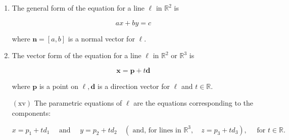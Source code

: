 \documentclass[10pt]{article}
\begin{document}
\begin{enumerate}
\item  The general form of the equation for a line $\ell$ in $\mathbb{R}^{2}$ is

$$
a x+b y=c
$$

where $\mathbf{n}=[a, b]$ is a normal vector for $\ell$.

\item  The vector form of the equation for a line $\ell$ in $\mathbb{R}^{2}$ or $\mathbb{R}^{3}$ is

$$
\mathbf{x}=\mathbf{p}+t \mathbf{d}
$$

where $\mathbf{p}$ is a point on $\ell, \mathbf{d}$ is a direction vector for $\ell$ and $t \in \mathbb{R}$.

$(\mathrm{xv})$ The parametric equations of $\ell$ are the equations corresponding to the components:

$$
x=p_{1}+t d_{1} \quad \text { and } \quad y=p_{2}+t d_{2} \quad\left(\text { and, for lines in } \mathbb{R}^{3}, \quad z=p_{3}+t d_{3}\right), \quad \text { for } t \in \mathbb{R} .
$$

\end{enumerate}





\newpage
\end{document}
